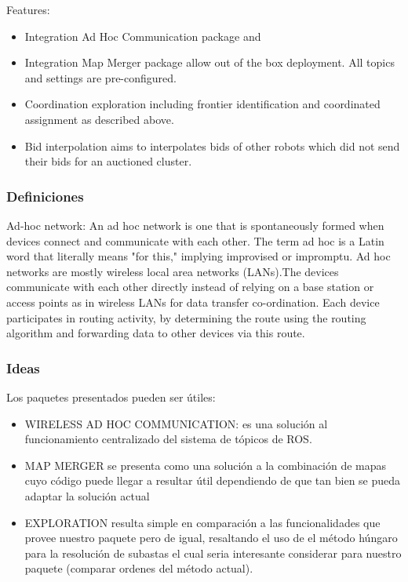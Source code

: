 Features:
\begin{itemize}
\item Integration Ad Hoc Communication package and
\item Integration Map Merger package allow out of the box deployment. All topics and settings are pre-configured.
\item Coordination exploration including frontier identification and coordinated assignment as described above.
\item Bid interpolation aims to interpolates bids of other robots which did not send their bids for an auctioned cluster.
\end{itemize}

\subsubsection{Definiciones}
Ad-hoc network: An ad hoc network is one that is spontaneously formed when devices connect and communicate with each other. The term ad hoc is a Latin word that literally means "for this," implying improvised or impromptu. Ad hoc networks are mostly wireless local area networks (LANs).The devices communicate with each other directly instead of relying on a base station or access points as in wireless LANs for data transfer co-ordination. Each device participates in routing activity, by determining the route using the routing algorithm and forwarding data to other devices via this route. 


\subsubsection{Ideas}
Los paquetes presentados pueden ser útiles:
\begin{itemize}
\item WIRELESS AD HOC COMMUNICATION: es una solución al funcionamiento centralizado del sistema de tópicos de ROS.
\item MAP MERGER se presenta como una solución a la combinación de mapas cuyo código puede llegar a resultar útil dependiendo de que tan bien se pueda adaptar la solución actual
\item EXPLORATION resulta simple en comparación a las funcionalidades que provee nuestro paquete pero de igual, resaltando el uso de el método húngaro para la resolución de subastas el cual seria interesante considerar para nuestro paquete (comparar ordenes del método actual).
\end{itemize}

